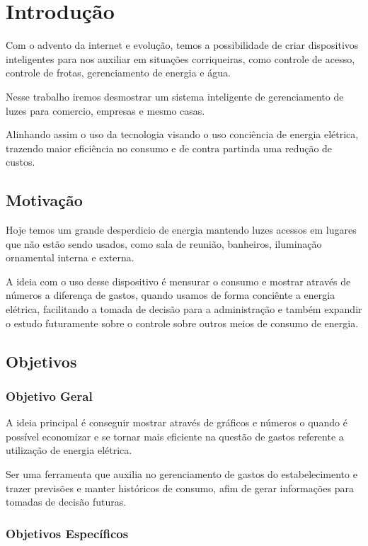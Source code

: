 \documentclass[openright]{normas-utf-tex} %
\begin{document}
\chapter{Introdução}


Com o advento da internet e evolução, temos a possibilidade de criar dispositivos inteligentes \cite{Novatec} para nos auxiliar em situações corriqueiras, como controle de acesso, controle de frotas, gerenciamento de energia e água.

Nesse trabalho iremos desmostrar um sistema inteligente de gerenciamento de luzes para comercio, empresas e mesmo casas.

Alinhando assim o uso da tecnologia visando o uso conciência de energia elétrica, trazendo maior eficiência no consumo e de contra partinda uma redução de custos.

\section{Motivação}

Hoje temos um grande desperdicio de energia mantendo luzes acessos em lugares que não estão sendo usados, como sala de reunião, banheiros, iluminação ornamental interna e externa.

A ideia com o uso desse dispositivo é mensurar o consumo e mostrar através de números a diferença de gastos, quando usamos de forma conciênte a energia elétrica, facilitando a tomada de decisão para a administração e também expandir o estudo futuramente sobre o controle sobre outros meios de consumo de energia.

\section{Objetivos}

\subsection{Objetivo Geral}

A ideia principal é conseguir mostrar através de gráficos e números o quando é possível economizar e se tornar mais eficiente na questão de gastos referente a utilização de energia elétrica.

Ser uma ferramenta que auxilia no gerenciamento de gastos do estabelecimento e trazer previsões e manter históricos de consumo, afim de gerar informações para tomadas de decisão futuras.

\subsection{Objetivos Específicos}
\end{document}
